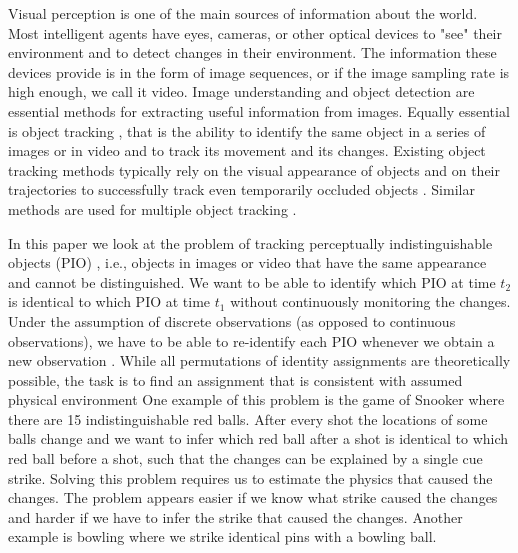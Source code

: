 \documentclass[letterpaper]{article}
\begin{document}
Visual perception is one of the main sources of information about the world. Most intelligent agents have eyes, cameras, or other optical devices to "see" their environment and to detect changes in their environment. The information these devices provide is in the form of image sequences, or if the image sampling rate is high enough, we call it video.
Image understanding \cite{sonka1999image,sridhar2011video} and object detection \cite{papageorgiou1998general} are essential methods for extracting useful information from images. Equally essential is object tracking \cite{yilmaz2006object}, that is the ability to identify the same object in a series of images or in video and to track its movement and its changes. Existing object tracking methods typically rely on the visual appearance of objects and on their trajectories to successfully track even temporarily occluded objects \cite{yilmaz2004contour,cutler2000robust,viola2005detecting}.
Similar methods are used for multiple object tracking \cite{berclaz2011multiple,yang2005fast,han2004algorithm}. 

In this paper we look at the problem of tracking perceptually indistinguishable objects (PIO) \cite{santore2005identifying}, i.e., objects in images or video that have the same appearance and cannot be distinguished. We want to be able to identify which PIO at time $t_2$ is identical to which PIO at time $t_1$ without continuously monitoring the changes. Under the assumption of discrete observations (as opposed to continuous observations), we have to be able to re-identify each PIO whenever we obtain a new observation \cite{pollock74}. While all permutations of identity assignments are theoretically possible, the task is to find an assignment that is consistent with assumed physical environment
One example of this problem is the game of Snooker where there are 15 indistinguishable red balls. After every shot the locations of some balls change and we want to infer which red ball after a shot is identical to which red ball before a shot, such that the changes can be explained by a single cue strike. Solving this problem requires us to estimate the physics that caused the changes. The problem appears easier if we know what strike caused the changes and harder if we have to infer the strike that caused the changes. Another example is bowling where we strike identical pins with a bowling ball.
\end{document}
